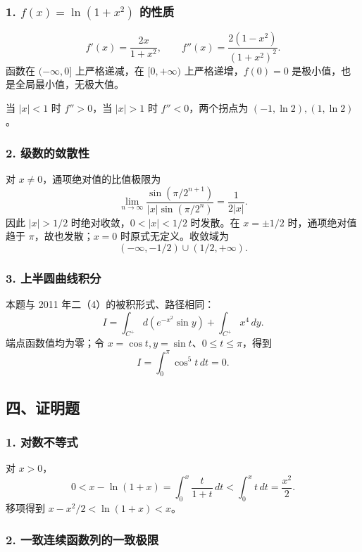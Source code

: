 \documentclass[11pt,fontset=fandol]{ctexart}
\begin{document}
\subsubsection{\texorpdfstring{1. \(f(x)=\ln(1+x^2)\)
的性质}{1. f(x)=\textbackslash ln(1+x\^{}2) 的性质}}\label{fxln1x2-ux7684ux6027ux8d28}

\[
f'(x)=\frac{2x}{1+x^2},\qquad f''(x)=\frac{2(1-x^2)}{(1+x^2)^2}.
\] 函数在 \((-\infty,0]\) 上严格递减，在 \([0,+\infty)\)
上严格递增，\(f(0)=0\) 是极小值，也是全局最小值，无极大值。

当 \(|x|<1\) 时 \(f''>0\)，当 \(|x|>1\) 时 \(f''<0\)，两个拐点为
\(\boxed{(-1,\ln2),(1,\ln2)}\)。

\subsubsection{2.
级数的敛散性}\label{ux7ea7ux6570ux7684ux655bux6563ux6027}

对 \(x\neq0\)，通项绝对值的比值极限为 \[
\lim_{n\to\infty}\frac{\sin(\pi/2^{n+1})}{|x|\sin(\pi/2^n)}=\frac1{2|x|}.
\] 因此 \(|x|>1/2\) 时绝对收敛，\(0<|x|<1/2\) 时发散。在 \(x=\pm1/2\)
时，通项绝对值趋于 \(\pi\)，故也发散；\(x=0\) 时原式无定义。收敛域为 \[
\boxed{(-\infty,-1/2)\cup(1/2,+\infty).}
\]

\subsubsection{3.
上半圆曲线积分}\label{ux4e0aux534aux5706ux66f2ux7ebfux79efux5206}

本题与 2011 年二（4）的被积形式、路径相同： \[
I=\int_{C^+}d(e^{-x^2}\sin y)+\int_{C^+}x^4\,dy.
\] 端点函数值均为零；令 \(x=\cos t,y=\sin t\)、\(0\leq t\leq\pi\)，得到
\[
\boxed{I=\int_0^\pi\cos^5t\,dt=0.}
\]

\subsection{四、证明题}\label{ux56dbux8bc1ux660eux9898}

\subsubsection{1. 对数不等式}\label{ux5bf9ux6570ux4e0dux7b49ux5f0f}

对 \(x>0\)， \[
0<x-\ln(1+x)=\int_0^x\frac{t}{1+t}\,dt<\int_0^xt\,dt=\frac{x^2}{2}.
\] 移项得到 \(\boxed{x-x^2/2<\ln(1+x)<x}\)。

\subsubsection{2.
一致连续函数列的一致极限}\label{ux4e00ux81f4ux8fdeux7eedux51fdux6570ux5217ux7684ux4e00ux81f4ux6781ux9650}
\end{document}
